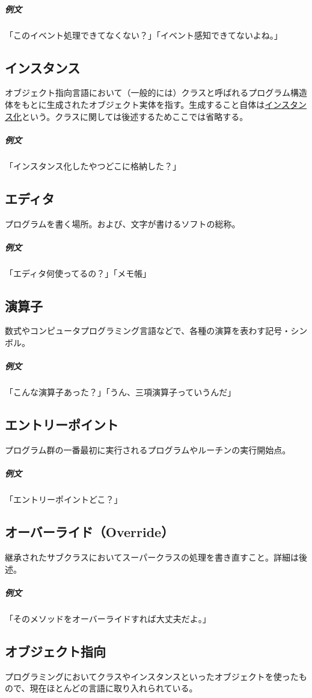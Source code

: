 \documentclass[dvipdfmx,jb5]{jreport}
\begin{document}
\subparagraph{例文} 「このイベント処理できてなくない？」「イベント感知できてないよね。」

\subsection{インスタンス}
オブジェクト指向言語において（一般的には）クラスと呼ばれるプログラム構造体をもとに生成されたオブジェクト実体を指す。生成すること自体は\underline{インスタンス化}という。クラスに関しては後述するためここでは省略する。

\subparagraph{例文} 「インスタンス化したやつどこに格納した？」

\subsection{エディタ}
プログラムを書く場所。および、文字が書けるソフトの総称。

\subparagraph{例文} 「エディタ何使ってるの？」「メモ帳」

\subsection{演算子}
数式やコンピュータプログラミング言語などで、各種の演算を表わす記号・シンボル。

\subparagraph{例文} 「こんな演算子あった？」「うん、三項演算子っていうんだ」

\subsection{エントリーポイント}
プログラム群の一番最初に実行されるプログラムやルーチンの実行開始点。

\subparagraph{例文} 「エントリーポイントどこ？」

\subsection{オーバーライド（Override）}
継承されたサブクラスにおいてスーパークラスの処理を書き直すこと。詳細は後述。

\subparagraph{例文} 「そのメソッドをオーバーライドすれば大丈夫だよ。」

\subsection{オブジェクト指向}
プログラミングにおいてクラスやインスタンスといったオブジェクトを使ったもので、現在ほとんどの言語に取り入れられている。
\end{document}
